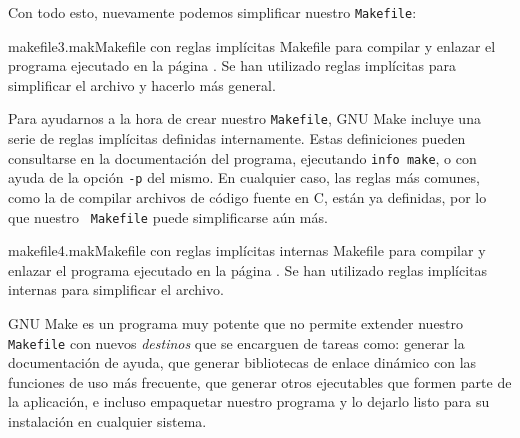 Con todo esto, nuevamente podemos simplificar nuestro {\tt Makefile}:

\begin{ejemplo}{makefile3.mak}{Makefile con reglas implícitas}
Makefile para compilar y enlazar el programa ejecutado en la página
\pageref{holafuncm}. Se han utilizado reglas implícitas para simplificar
el archivo y hacerlo más general.
\end{ejemplo}

Para ayudarnos a la hora de crear nuestro {\tt Makefile}, {\sf GNU
Make} incluye una serie de reglas implícitas definidas internamente.
Estas definiciones pueden consultarse en la documentación del programa,
ejecutando {\tt info make}, o con ayuda de la opción {\tt -p} del mismo.
En cualquier caso, las reglas más comunes, como la de compilar archivos
de código fuente en C, están ya definidas, por lo que nuestro {\tt
Makefile} puede simplificarse aún más.

\begin{ejemplo}{makefile4.mak}{Makefile con reglas implícitas internas}
Makefile para compilar y enlazar el programa ejecutado en la página
\pageref{holafuncm}. Se han utilizado reglas implícitas internas para
simplificar el archivo.
\end{ejemplo}

{\sf GNU Make} es un programa muy potente que no permite extender
nuestro {\tt Makefile} con nuevos {\em destinos} que se encarguen de
tareas como: generar la documentación de ayuda, que generar bibliotecas
de enlace dinámico con las funciones de uso más frecuente, que generar
otros ejecutables que formen parte de la aplicación, e incluso
empaquetar nuestro programa y lo dejarlo listo para su instalación en
cualquier sistema.

